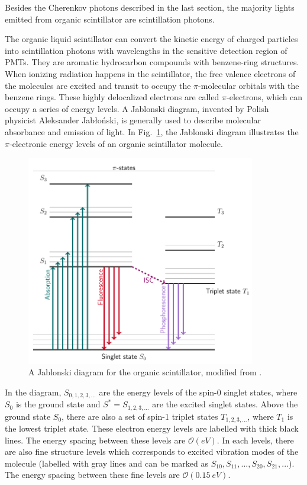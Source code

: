 Besides the Cherenkov photons described in the last section, the majority lights emitted from organic scintillator are scintillation photons.

The organic liquid scintillator can convert the kinetic energy of charged particles into scintillation photons with wavelengths in the sensitive detection region of PMTs. They are aromatic hydrocarbon compounds with benzene-ring structures. When ionizing radiation happens in the scintillator, the free valence electrons of the molecules are excited and transit to occupy the $\pi$-molecular orbitals with the benzene rings. These highly delocalized electrons are called $\pi$-electrons, which can occupy a series of energy levels. A Jablonski diagram, invented by Polish physicist Aleksander Jab\l o\'{n}ski, is generally used to describe molecular absorbance and emission of light. In Fig.~\ref{jablonski}, the Jablonski diagram illustrates the $\pi$-electronic energy levels of an organic scintillator molecule\cite{knoll2010radiation,leo2012techniques}. 
\begin{figure}[!htb]
	\centering
	\includegraphics[width=10cm]{jablonski.png}
	\caption{A Jablonski diagram for the organic scintillator, modified from \cite{birks1965theory, knoll2010radiation}.}
	\label{jablonski}
\end{figure}

In the diagram, $S_{0,1,2,3,...}$ are the energy levels of the spin-0 singlet states, where $S_0$ is the ground state and $S^*=S_{1,2,3,...}$ are the excited singlet states. Above the ground state $S_0$, there are also a set of spin-1 triplet states $T_{1,2,3,...}$, where $T_1$ is the lowest triplet state. These electron energy levels are labelled with thick black lines. The energy spacing between these levels are $\mathcal{O}(eV)$. In each levels, there are also fine structure levels which corresponds to excited vibration modes of the molecule (labelled with gray lines and can be marked as $S_{10}, S_{11}, ..., S_{20},S_{21}, ...$). The energy spacing between these fine levels are $\mathcal{O}(0.15~eV)$\cite{leo2012techniques, knoll2010radiation}.

